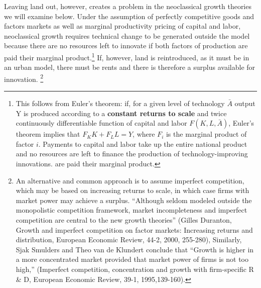 Leaving land out, however, creates a problem in  the neoclassical growth theories we will examine below. Under the assumption of perfectly competitive goods and factors markets as well as marginal productivity pricing of capital and labor, neoclassical growth requires technical change to be generated outside the model because there are no resources left to innovate if both factors of production are paid their marginal product.\footnote{This follows from Euler’s theorem: if, for a given level of technology $\bar A$ output Y is produced according to a \textbf{constant returns to scale} and twice continuously differentiable function of capital and labor $F(K, L, \bar A)$, Euler’s theorem implies that $F_K K + F_L L=Y$, where $F_i$ is the marginal product of factor $i$. Payments to  capital and labor take up the entire national product and no resources are left to finance the production of technology-improving innovations. are paid their marginal product.} 
If, however, land is reintroduced, as it must be in an urban model, there must be rents and there is therefore a surplus available for innovation.
\footnote{An alternative and common approach is to assume imperfect competition, which may be based on increasing returns to scale, in which case firms with market power may achieve a surplus. ``Although seldom modeled outside the monopolistic competition framework, market incompleteness and imperfect competition are central to the new growth theories'' (Gilles Duranton, Growth and imperfect competition on factor markets: Increasing returns and distribution, European Economic Review, 44-2, 2000, 255-280), Similarly, Sjak Smulders and Theo van de Klundert conclude that ``Growth is higher in a more concentrated market provided that market power of firms is not too high,'' (Imperfect competition, concentration and growth with firm-specific R \& D, European Economic Review, 39-1, 1995,139-160).}



